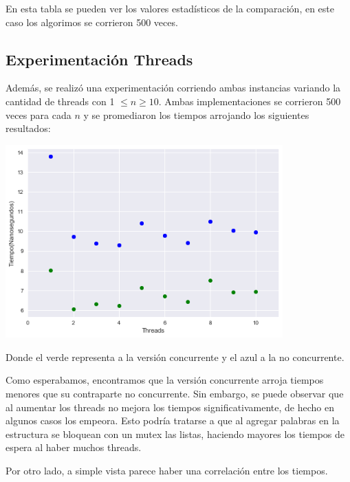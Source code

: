 En esta tabla se pueden ver los valores estadísticos de la comparación, en este caso
los algorimos se corrieron 500 veces.

\subsection{Experimentación Threads}

Además, se realizó una experimentación corriendo ambas instancias variando la cantidad de threads con 1 $\leq n \geq 10$.
Ambas implementaciones se corrieron 500 veces para cada $n$ y se promediaron los tiempos arrojando los siguientes resultados:

\begin{center}
\includegraphics[width=0.8\textwidth]{imagenes/threads.png}
\end{center}

Donde el verde representa a la versión concurrente y el azul a la no concurrente.

Como esperabamos, encontramos que la versión concurrente arroja tiempos menores que su contraparte no concurrente. Sin embargo, se puede observar que al aumentar los threads no mejora los tiempos significativamente, de hecho en algunos casos los empeora. Esto podría tratarse a que al agregar palabras en la estructura se bloquean con un mutex las listas, haciendo mayores los tiempos de espera al haber muchos threads.

Por otro lado, a simple vista parece haber una correlación entre los tiempos.


